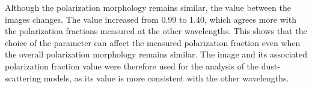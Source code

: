 Although the polarization morphology remains similar, the \POLFsi value between the images changes. The \POLFsi value increased from 0.99 to 1.40, which agrees more with the polarization fractions measured at the other wavelengths. This shows that the choice of the \rob parameter can affect the measured polarization fraction even when the overall polarization morphology remains similar. The \Ro image and its associated polarization fraction value were therefore used for the analysis of the dust-scattering models, as its value is more consistent with the other wavelengths.























